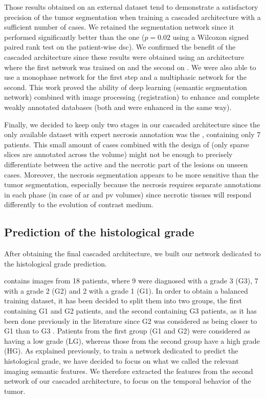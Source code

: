 Those results obtained on an external dataset tend to demonstrate a satisfactory precision
of the tumor segmentation when training a cascaded architecture with a
sufficient number of cases.
We retained the  segmentation network since it performed
significantly better than the  one ($ p = 0.02 $ using a Wilcoxon signed
paired rank test on the patient-wise \ac{dsc}).
We confirmed the benefit of the cascaded architecture since these results
were obtained using an architecture where the first network was trained
on  and the second on . We were also able to use
a monophase network for the first step and a multiphasic network for the
second.
This work proved the ability of deep learning (semantic segmentation
network) combined with image processing (registration) to enhance and
complete weakly annotated databases (both  and  were
enhanced in the same way).

Finally, we decided to keep only two stages in our cascaded architecture
since the only available dataset with expert necrosis annotation was the
, containing only 7 patients. This small amount of cases
combined with the design of  (only sparse slices are
annotated across the volume) might not be enough to precisely
differentiate between the active and the necrotic part of the lesions on
unseen cases. Moreover, the necrosis segmentation appears to be more
sensitive than the tumor segmentation, especially because the necrosis
requires separate annotations in each phase (in case of \ac{ar} and \ac{pv} volumes) since necrotic tissues will respond differently to the evolution of contrast medium.

\subsection{Prediction of the histological grade}\label{prediction-of-the-histological-grade-on-tcia-db}

After obtaining the final cascaded architecture, we built our network dedicated to the
histological grade prediction.

 contains images from 18 patients, where 9 were diagnosed with a
grade 3 (G3), 7 with a grade 2 (G2) and 2 with a grade 1 (G1). In order
to obtain a balanced training dataset, it has been decided to split them
into two groups, the first containing G1 and G2 patients, and the second containing G3 patients, as it has been done previously in the literature since G2
was considered as being closer to G1 than to G3 \cite{Han2013,Zucman-Rossi2015}. Patients from the first group (G1 and G2) were considered as
having a low grade (LG), whereas those from the second group have a high
grade (HG).
As explained previously, to train a network dedicated to predict the
histological grade, we have decided to focus on what we called the
relevant imaging semantic features.
We therefore extracted the features from the second network of our
cascaded architecture, to focus on the temporal behavior of the tumor.

